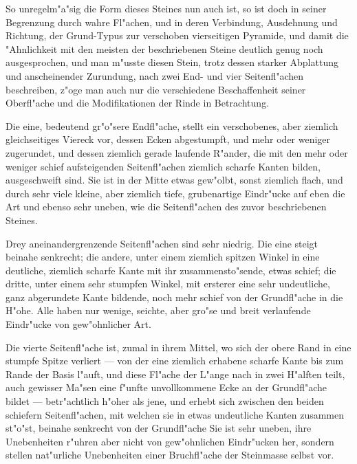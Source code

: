 \documentclass[a4paper, 11pt, oneside, german]{article}
\begin{document}
So unregelm"a"sig die Form dieses Steines nun auch ist, so ist doch in seiner Begrenzung durch wahre Fl"achen, und in deren Verbindung, Ausdehnung und Richtung, der Grund-Typus zur verschoben vierseitigen Pyramide, und damit die "Ahnlichkeit mit den meisten der beschriebenen Steine deutlich genug noch ausgesprochen, und man m"usste diesen Stein, trotz dessen starker Abplattung und anscheinender Zurundung, nach zwei End- und vier Seitenfl"achen beschreiben, z"oge man auch nur die verschiedene Beschaffenheit seiner Oberfl"ache und die Modifikationen der Rinde in Betrachtung.

Die eine, bedeutend gr"o"sere Endfl"ache, stellt ein verschobenes, aber ziemlich gleichseitiges Viereck vor, dessen Ecken abgestumpft, und mehr oder weniger zugerundet, und dessen ziemlich gerade laufende R"ander, die mit den mehr oder weniger schief aufsteigenden Seitenfl"achen ziemlich scharfe Kanten bilden, ausgeschweift sind. Sie ist in der Mitte etwas gew"olbt, sonst ziemlich flach, und durch sehr viele kleine, aber ziemlich tiefe, grubenartige Eindr"ucke auf eben die Art und ebenso sehr uneben, wie die Seitenfl"achen des zuvor beschriebenen Steines.

Drey aneinandergrenzende Seitenfl"achen sind sehr niedrig. Die eine steigt beinahe senkrecht; die andere, unter einem ziemlich spitzen Winkel in eine deutliche, ziemlich scharfe Kante mit ihr zusammensto"sende, etwas schief; die dritte, unter einem sehr stumpfen Winkel, mit ersterer eine sehr undeutliche, ganz abgerundete Kante bildende, noch mehr schief von der Grundfl"ache in die H"ohe. Alle haben nur wenige, seichte, aber gro"se und breit verlaufende Eindr"ucke von gew"ohnlicher Art.

Die vierte Seitenfl"ache ist, zumal in ihrem Mittel, wo sich der obere Rand in eine stumpfe Spitze verliert --- von der eine ziemlich erhabene scharfe Kante bis zum Rande der Basis l"auft, und diese Fl"ache der L"ange nach in zwei H"alften teilt, auch gewisser Ma"sen eine f"unfte unvollkommene Ecke an der Grundfl"ache bildet --- betr"achtlich h"oher als jene, und erhebt sich zwischen den beiden schiefern Seitenfl"achen, mit welchen sie in etwas undeutliche Kanten zusammen st"o"st, beinahe senkrecht von der Grundfl"ache Sie ist sehr uneben, ihre Unebenheiten r"uhren aber nicht von gew"ohnlichen Eindr"ucken her, sondern stellen nat"urliche Unebenheiten einer Bruchfl"ache der Steinmasse selbst vor.
\end{document}
